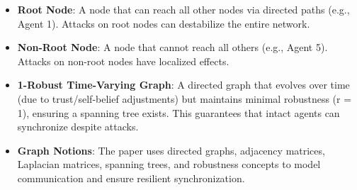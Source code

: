 \documentclass{article}
\begin{document}
\begin{itemize}
    \item \textbf{Root Node}: A node that can reach all other nodes via directed paths (e.g., Agent 1). Attacks on root nodes can destabilize the entire network.
    \item \textbf{Non-Root Node}: A node that cannot reach all others (e.g., Agent 5). Attacks on non-root nodes have localized effects.
    \item \textbf{1-Robust Time-Varying Graph}: A directed graph that evolves over time (due to trust/self-belief adjustments) but maintains minimal robustness (r = 1), ensuring a spanning tree exists. This guarantees that intact agents can synchronize despite attacks.
    \item \textbf{Graph Notions}: The paper uses directed graphs, adjacency matrices, Laplacian matrices, spanning trees, and robustness concepts to model communication and ensure resilient synchronization.
\end{itemize}
\end{document}
